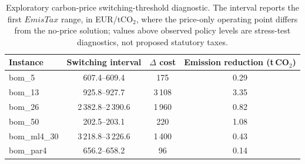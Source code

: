 \begin{table}[!htbp]\centering\scriptsize
\setlength{\tabcolsep}{4pt}
\caption{Exploratory carbon-price switching-threshold diagnostic. The interval reports the first $EmisTax$ range, in EUR/tCO$_2$, where the price-only operating point differs from the no-price solution; values above observed policy levels are stress-test diagnostics, not proposed statutory taxes.}\label{tab:pricethreshold}
\begin{tabular}{lccc}
\toprule
Instance & Switching interval & $\Delta$ cost & Emission reduction (t\,CO$_2$)\\
\midrule
bom\_5 & 607.4--609.4 & 175 & 0.29 \\
bom\_13 & 925.8--927.7 & 3\,108 & 3.35 \\
bom\_26 & 2\,382.8--2\,390.6 & 1\,960 & 0.82 \\
bom\_50 & 202.5--203.1 & 220 & 1.08 \\
bom\_ml4\_30 & 3\,218.8--3\,226.6 & 1\,400 & 0.43 \\
bom\_par4 & 656.2--658.2 & 96 & 0.14 \\
\bottomrule
\end{tabular}
\end{table}
